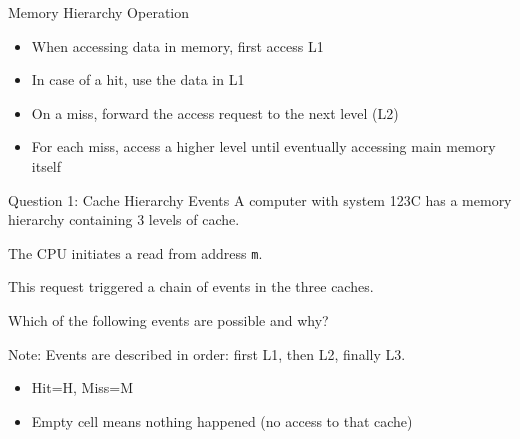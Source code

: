 \documentclass[aspectratio=169,12pt]{beamer}
\begin{document}
\begin{frame}{Memory Hierarchy Operation}
\begin{itemize}
    \item When accessing data in memory, first access L1
    \item In case of a hit, use the data in L1
    \item On a miss, forward the access request to the next level (L2)
    \item For each miss, access a higher level until eventually accessing main memory itself
\end{itemize}
\vspace{0.5cm}
\begin{center}
\end{center}
\end{frame}

\begin{frame}{Question 1: Cache Hierarchy Events}
A computer with system 123C has a memory hierarchy containing 3 levels of cache.

The CPU initiates a read from address \texttt{m}.

This request triggered a chain of events in the three caches.

Which of the following events are possible and why?

\vspace{0.3cm}
\small
Note: Events are described in order: first L1, then L2, finally L3.
\begin{itemize}
    \item Hit=H, Miss=M
    \item Empty cell means nothing happened (no access to that cache)
\end{itemize}
\end{frame}
\end{document}
